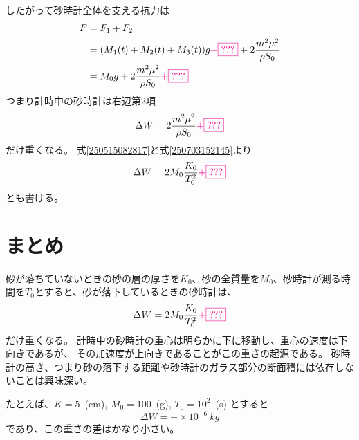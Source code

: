 \documentclass[]{article}
\begin{document}
したがって砂時計全体を支える抗力は
\begin{align}
   F &= F_1 + F_2  \label{250703170301a} \\
   &=(M_1(t) + M_2(t)  +M_3(t) )g  \textcolor{magenta}{+\fbox{???}} +  2\frac{m^2\mu^2}{\rho S_0}   \label{250703170301b} \\
   &=  M_0 g +  2 \frac{m^2\mu^2}{\rho S_0} \textcolor{magenta}{+\fbox{???}}  \label{250703170301c} 
\end{align}
つまり計時中の砂時計は右辺第2項
\begin{equation} \label{250703173105} 
   \Delta W  = 2 \frac{m^2\mu^2}{\rho S_0} \textcolor{magenta}{+\fbox{???}}
\end{equation}
だけ重くなる。
式\eqref{250515082817}と式\eqref{250703152145}より
\begin{equation} \label{250703173052} 
    \Delta W  =  2M_0 \frac{K_0}{T_0^2} \textcolor{magenta}{+\fbox{???}}
\end{equation}
とも書ける。


\section{まとめ}
砂が落ちていないときの砂の層の厚さを$K_0$、砂の全質量を$M_0$、砂時計が測る時間を$T_0$とすると、砂が落下しているときの砂時計は、
\begin{equation} \label{250518122927} 
   \Delta W = 2 M_0 \frac{K_0}{T_0^2} \textcolor{magenta}{+\fbox{???}}
\end{equation}
だけ重くなる。
計時中の砂時計の重心は明らかに下に移動し、重心の速度は下向きであるが、
その加速度が上向きであることがこの重さの起源である。
砂時計の高さ、つまり砂の落下する距離や砂時計のガラス部分の断面積には依存しないことは興味深い。


たとえば、$K=5$~(\si{cm}), $M_0=100$~(\si{g}), $T_0=10^2$~(\si{s}) とすると
\begin{equation} \label{250517205142} 
   \Delta W = -\times 10^{-6}~\si{kg}
\end{equation}
であり、この重さの差はかなり小さい。
\end{document}
